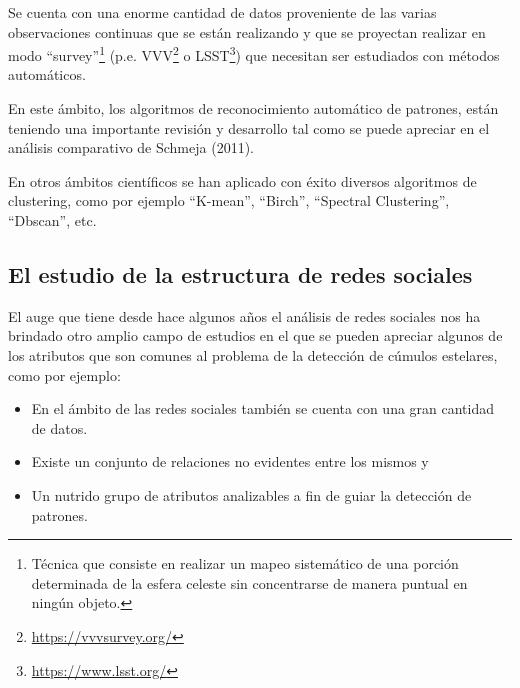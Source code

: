 \documentclass[
	11pt,oneside,a4paper,
	headsepline,footsepline,
	fleqn,
]{memoir}
\begin{document}
Se cuenta con una enorme cantidad de datos proveniente de las varias observaciones continuas que se están realizando y que se proyectan realizar en modo “survey”\footnote{Técnica que consiste en realizar un mapeo sistemático de una porción determinada de la esfera celeste sin concentrarse de manera puntual en ningún objeto.} (p.e. VVV\footnote{\url{https://vvvsurvey.org/}} o LSST\footnote{\url{https://www.lsst.org/}}) que necesitan ser estudiados con métodos automáticos. 

En este ámbito, los algoritmos de reconocimiento automático de patrones, están teniendo una importante revisión y desarrollo tal como se puede apreciar en el análisis comparativo de Schmeja (2011)\cite{Schmeja2011}.


En otros ámbitos científicos se han aplicado con éxito diversos algoritmos de clustering, como por ejemplo “K-mean”, “Birch”, “Spectral Clustering”, “Dbscan”, etc.\cite{rodriguez2019clustering}


\subsection{El estudio de la estructura de redes sociales}

El auge que tiene desde hace algunos años el análisis de redes sociales nos ha brindado otro amplio campo de estudios en el que se pueden apreciar algunos de los atributos que son comunes al problema de la detección de cúmulos estelares, como por ejemplo:

\begin{itemize}
	\item En el ámbito de las redes sociales también se cuenta con una gran cantidad de datos.
	\item Existe un conjunto de relaciones no evidentes entre los mismos y
	\item Un nutrido grupo de atributos analizables a fin de guiar la detección de patrones.
\end{itemize}
\end{document}
